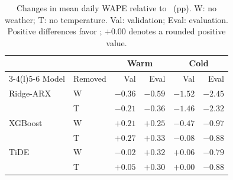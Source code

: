 \begin{table}[t]
\caption{Changes in mean daily WAPE relative to \full\ (pp). W: no weather; T: no temperature. Val: validation; Eval: evaluation. Positive differences favor \full; $+0.00$ denotes a rounded positive value.}
\label{tab:contrasts}
\centering
\footnotesize
\setlength{\tabcolsep}{3pt}
\begin{tabular}{@{}llrrrr@{}}
\toprule
&& \multicolumn{2}{c}{Warm} & \multicolumn{2}{c}{Cold}\\
\cmidrule(lr){3-4}\cmidrule(l){5-6}
Model & Removed & Val & Eval & Val & Eval\\
\midrule
Ridge-ARX & W & $-0.36$ & $-0.59$ & $-1.52$ & $-2.45$\\
 & T & $-0.21$ & $-0.36$ & $-1.46$ & $-2.32$\\
XGBoost & W & $+0.21$ & $+0.25$ & $-0.47$ & $-0.97$\\
 & T & $+0.27$ & $+0.33$ & $-0.08$ & $-0.88$\\
TiDE & W & $-0.02$ & $+0.32$ & $+0.06$ & $-0.79$\\
 & T & $+0.05$ & $+0.30$ & $+0.00$ & $-0.88$\\
\bottomrule
\end{tabular}
\end{table}

